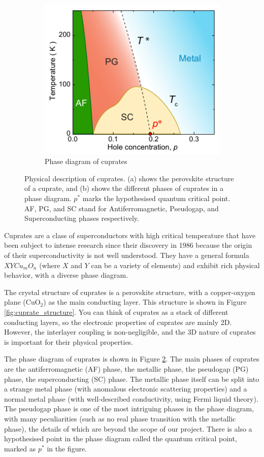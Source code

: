 \begin{figure}
\begin{subfigure}{0.5\textwidth}
        \includegraphics[width=\textwidth]{figures/phase_diagram}
        \caption{Phase diagram of cuprates}
        \label{fig:phase_diagram}
    \end{subfigure}
    \caption{Physical description of cuprates. (a) shows the perovskite structure of a cuprate,
    and (b) shows the different phases of cuprates in a phase diagram. $p^*$ marks the hypothesised
    quantum critical point. AF, PG, and SC stand for Antiferromagnetic, Pseudogap, and
    Superconducting phases respectively.}
\end{figure}

Cuprates are a class of superconductors with high critical temperature that have been subject
to intense research since their discovery in 1986 because the origin of their superconductivity is not well understood. They have a general formula $XYCu_mO_n$ (where $X$ and $Y$ can be a variety of elements) and exhibit rich physical behavior, 
with a diverse phase diagram.

The crystal structure of cuprates is a perovskite structure, with a copper-oxygen plane
($\mathrm{CuO}_2$) as the main conducting layer. This structure is shown in Figure
\ref{fig:cuprate_structure}. You can think of cuprates as a stack of different conducting layers,
so the electronic properties of cuprates are mainly 2D. However, the interlayer coupling is
non-negligible, and the 3D nature of cuprates is important for their physical properties.

The phase diagram of cuprates is shown in Figure \ref{fig:phase_diagram}. The main phases of
cuprates are the antiferromagnetic (AF) phase, the metallic phase, the pseudogap (PG) phase,
the superconducting (SC) phase. 
The metallic phase itself can be split into a strange metal phase 
(with anomalous electronic scattering properties) and a normal metal phase 
(with well-described conductivity, using Fermi liquid theory).
The pseudogap phase is one of the most intriguing phases in the phase diagram, 
with many peculiarities (such as no real phase transition with the metallic phase), 
the details of which are beyond the scope of our project.
There is also a hypothesised point in the phase diagram called the quantum critical point, marked as $p^*$ in the figure.
